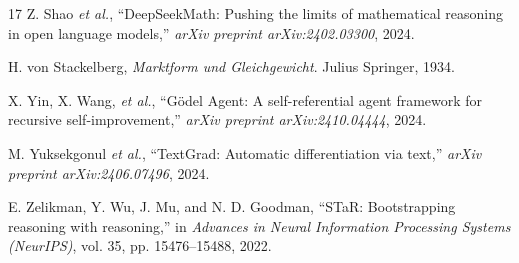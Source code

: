 \documentclass[10pt,twocolumn,letterpaper]{article}
\begin{document}
\begin{thebibliography}{17}
Z. Shao \emph{et al.}, ``DeepSeekMath: Pushing the limits of mathematical reasoning in open language models,'' \emph{arXiv preprint arXiv:2402.03300}, 2024.

H. von Stackelberg, \emph{Marktform und Gleichgewicht}. Julius Springer, 1934.

X. Yin, X. Wang, \emph{et al.}, ``G\"{o}del Agent: A self-referential agent framework for recursive self-improvement,'' \emph{arXiv preprint arXiv:2410.04444}, 2024.

M. Yuksekgonul \emph{et al.}, ``TextGrad: Automatic differentiation via text,'' \emph{arXiv preprint arXiv:2406.07496}, 2024.

E. Zelikman, Y. Wu, J. Mu, and N. D. Goodman, ``STaR: Bootstrapping reasoning with reasoning,'' in \emph{Advances in Neural Information Processing Systems (NeurIPS)}, vol. 35, pp. 15476--15488, 2022.

\end{thebibliography}
\end{document}
